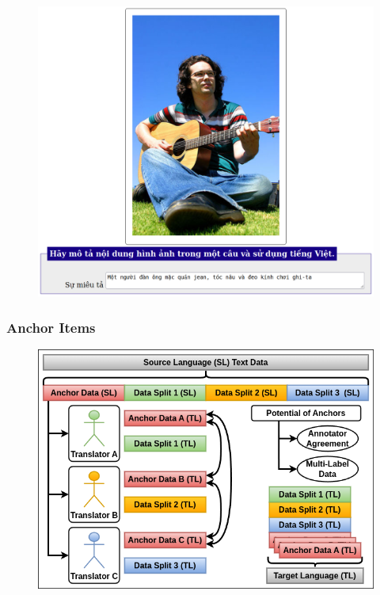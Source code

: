 \documentclass[aspectratio=169]{beamer}
\begin{document}
\begin{frame}[fragile]
\begin{minipage}{.45\textwidth}
\begin{figure}
        \end{figure}
    \end{minipage}\hfill%
    \begin{minipage}{.35\textwidth}
        \centering
        \begin{figure}
            \includegraphics[width=1.0\textwidth]{images/mtacr-potato-flickr30k-vie.png} 
        \end{figure}
    \end{minipage}
\end{frame}

\begin{frame}[fragile]
	\frametitle{Anchor Items}
    \begin{figure}
	    \centering
	    \includegraphics[width=.70\textwidth]{images/CRAMT-Tool-AnnotationQuality.png}
	\end{figure}
\end{frame}
\end{document}
